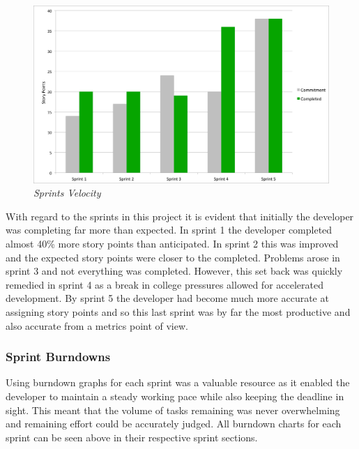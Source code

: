 \begin{figure}[!ht]
\centering
\includegraphics*[width=\textwidth]{images/velocity2}
\caption{\em Sprints Velocity}
\label{fig:velocity}
\end{figure}

With regard to the \glspl{sprint} in this project it is evident that initially the developer was completing far more than expected. In sprint 1 the developer completed almost 40\% more story points than anticipated. In sprint 2 this was improved and the expected story points were closer to the completed. Problems arose in sprint 3 and not everything was completed. However, this set back was quickly remedied in sprint 4 as a break in college pressures allowed for accelerated development. By sprint 5 the developer had become much more accurate at assigning story points and so this last sprint was by far the most productive and also accurate from a metrics point of view.

\subsubsection{Sprint Burndowns}

Using burndown graphs for each sprint was a valuable resource as it enabled the developer to maintain a steady working pace while also keeping the deadline in sight. This meant that the volume of tasks remaining was never overwhelming and remaining effort could be accurately judged. All burndown charts for each sprint can be seen above in their respective sprint sections.
